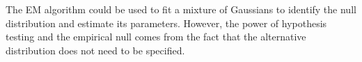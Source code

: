 The EM algorithm \citep{dempster1977maximum} could be used to fit a mixture of Gaussians to identify the null distribution and estimate its parameters. However, the power of hypothesis testing and the empirical null comes from the fact that the alternative distribution does not need to be specified.